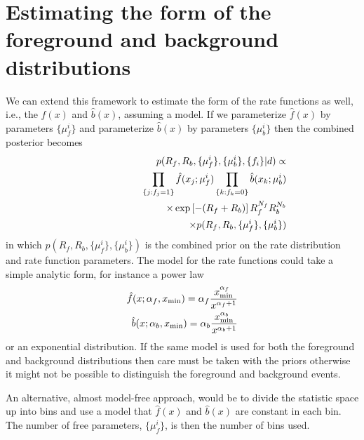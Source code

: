 \documentclass[aps,prd,reprint]{revtex4-1}
\begin{document}
\section{Estimating the form of the foreground and background distributions}
We can extend this framework to estimate the form of the rate functions as well, i.e., the $\hat{f}(x)$ and $\hat{b}(x)$, assuming a model. If we parameterize $\hat{f}(x)$ by parameters $\{\mu^i_f\}$ and parameterize $\hat{b}(x)$ by parameters $\{\mu^i_b\}$ then the combined posterior becomes
\begin{eqnarray}
&&p(R_f, R_b, \{\mu_f^i\}, \{\mu_b^i\}, \{f_i\} | d)  \propto \nonumber \\   && \hspace{2cm} \prod_{\{j :   f_j=1\}} \hat{f}(x_j ; \mu_f^i)\prod_{\{k : f_k=0\}} \hat{b}(x_k ; \mu_b^i) \nonumber \\ &&\hspace{2.25cm}\times \exp\left[-(R_f+R_b)\right]    R_f^{N_f} R_b^{N_b} \nonumber \\ && \hspace{2.5cm}\times p(R_f, R_b, \{\mu_f^i\}, \{\mu_b^i\}) \label{fullpost}
\end{eqnarray}
in which $p(R_f, R_b, \{\mu_f^i\}, \{\mu_b^i\})$ is the combined prior on the rate distribution and rate function parameters. The model for the rate functions could take a simple analytic form, for instance a power law
\begin{eqnarray}
\hat{f}(x; \alpha_f, x_{\rm min}) = \alpha_f \frac{x_{\rm min}^{\alpha_f}}{x^{\alpha_f+1}} \nonumber \\
\hat{b}(x; \alpha_b, x_{\rm min}) = \alpha_b \frac{x_{\rm min}^{\alpha_b}}{x^{\alpha_b+1}}
\end{eqnarray}
or an exponential distribution. If the same model is used for both the foreground and background distributions then care must be taken with the priors otherwise it might not be possible to distinguish the foreground and background events. 

An alternative, almost model-free approach, would be to divide the statistic space up into bins and use a model that $\hat{f}(x)$ and $\hat{b}(x)$ are constant in each bin. The number of free parameters, $\{\mu_f^i\}$, is then the number of bins used.
\end{document}
